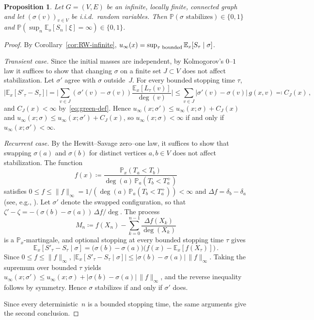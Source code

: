 \documentclass[aop]{imsart}
\theoremstyle{plain}
\newtheorem{proposition}[theorem]{Proposition}
\theoremstyle{definition}
\newcommand{\E}{\mathbb{E}}
\renewcommand{\P}{\mathbb{P}}
\begin{document}
	
	\begin{proposition}\label{prop:01-law}
		Let $G=(V,E)$ be an infinite, locally finite, connected graph and let
		$(\sigma(v))_{v\in V}$ be i.i.d.\ random variables. Then
		$\P(\sigma \text{ stabilizes})\in\{0,1\}$ and $\P(\sup_n\E_o[S_n\mid\xi]=\infty)\in\{0,1\}$.
	\end{proposition}
	\begin{proof}
		By Corollary~\ref{cor:RW-infinite}, $u_\infty(x)=\sup_{\tau\textup{ bounded}}\E_x[S_\tau\mid\sigma]$.
		
		\emph{Transient case.} Since the initial masses are independent, by Kolmogorov's $0$--$1$ law it suffices to show that changing $\sigma$ on a finite set $J\subset V$ does not affect stabilization. Let $\sigma'$ agree with $\sigma$ outside~$J$. For every bounded stopping time $\tau$,
		\[
		\bigl|\E_x[S'_\tau-S_\tau]\bigr|=\biggl|\sum_{v\in J}(\sigma'(v)-\sigma(v))\frac{\E_x[L_\tau(v)]}{\deg(v)}\biggr|\leq\sum_{v\in J}|\sigma'(v)-\sigma(v)|\,g(x,v)\eqqcolon C_J(x)\,,
		\]
		and $C_J(x)<\infty$ by~\eqref{eq:green-def}. Hence $u_\infty(x;\sigma')\leq u_\infty(x;\sigma)+C_J(x)$ and $u_\infty(x;\sigma)\leq u_\infty(x;\sigma')+C_J(x)$, so $u_\infty(x;\sigma)<\infty$ if and only if $u_\infty(x;\sigma')<\infty$.
		
		\emph{Recurrent case.} By the Hewitt--Savage zero--one law, it suffices to show that swapping $\sigma(a)$ and $\sigma(b)$ for distinct vertices $a,b\in V$ does not affect stabilization.  The function
		\[
		f(x) \coloneqq \frac{\P_x(T_a<T_b)}{\deg(a)\,\P_a(T_b < T_a^+)}
		\]
		satisfies $0 \le f \le \|f\|_\infty= 1/(\deg(a)\,\P_a(T_b < T_a^+))<\infty$ and $\Delta f = \delta_b - \delta_a$ (see, e.g., \citet[Proposition~2.1 and eq.~(2.4)]{LP16}). Let $\sigma'$ denote the swapped configuration, so that $\zeta'-\zeta = -(\sigma(b)-\sigma(a))\,\Delta f/\deg$. The process
		\[
		M_n\coloneqq f(X_n)-\sum_{k=0}^{n-1}\frac{\Delta f(X_k)}{\deg(X_k)}
		\]
		is a $\P_x$-martingale, and optional stopping at every bounded stopping time $\tau$ gives
		\[
		\E_x[S'_\tau - S_\tau\mid\sigma] = \bigl(\sigma(b)-\sigma(a)\bigr)\bigl(f(x) - \E_x[f(X_\tau)]\bigr)\,.
		\]
		Since $0\leq f\leq\|f\|_\infty$, $|\E_x[S'_\tau - S_\tau\mid\sigma]|\leq|\sigma(b)-\sigma(a)|\,\|f\|_\infty$. Taking the supremum over bounded $\tau$ yields $u_\infty(x;\sigma')\leq u_\infty(x;\sigma)+|\sigma(b)-\sigma(a)|\,\|f\|_\infty$, and the reverse inequality follows by symmetry. Hence $\sigma$ stabilizes if and only if $\sigma'$ does.
		
		Since every deterministic~$n$ is a bounded stopping time, the same arguments give the second conclusion. %
	\end{proof}
	
\end{document}
